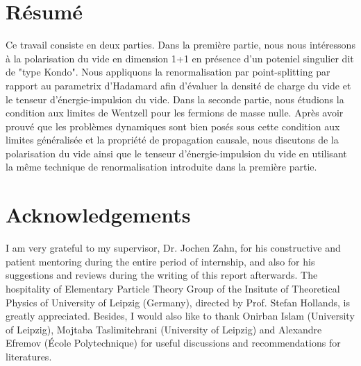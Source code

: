 \section*{Résumé}
Ce travail consiste en deux parties. 
Dans la première partie, nous nous intéressons à la polarisation du vide en dimension 1+1 en présence d'un poteniel singulier dit de "type Kondo".
Nous appliquons la renormalisation par point-splitting par rapport au parametrix d'Hadamard afin d'évaluer la densité de charge du vide et le tenseur d'énergie-impulsion du vide.
Dans la seconde partie, nous étudions la condition aux limites de Wentzell pour les fermions de masse nulle.
Après avoir prouvé que les problèmes dynamiques sont bien posés sous cette condition aux limites généralisée et la propriété de propagation causale,
nous discutons de la polarisation du vide ainsi que le tenseur d'énergie-impulsion du vide en utilisant la même technique de renormalisation introduite dans la première partie.

\newpage
\section*{Acknowledgements}
I am very grateful to my supervisor, Dr. Jochen Zahn, for his constructive and patient mentoring during the entire period of internship, and also for his suggestions and reviews during the writing of this report afterwards.
The hospitality of Elementary Particle Theory Group of the Insitute of Theoretical Physics of University of Leipzig (Germany), directed by Prof. Stefan Hollands, is greatly appreciated.
Besides, I would also like to thank Onirban Islam (University of Leipzig), Mojtaba Taslimitehrani (University of Leipzig) and Alexandre Efremov (École Polytechnique) for useful discussions and recommendations for literatures. 